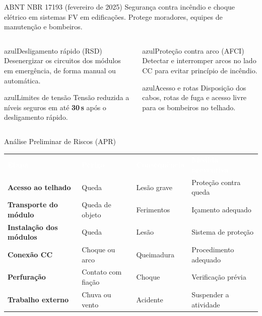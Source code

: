 \documentclass[aspectratio=169,10pt,xcolor=table]{beamer}
\newcommand{\cabecalho}{\rowcolor{azul}}
\newcommand{\tcab}[1]{\textcolor{white}{\bfseries #1}}
\begin{document}
\begin{frame}{ABNT NBR 17193 (fevereiro de 2025)}
  Segurança contra \alert{incêndio e choque elétrico} em sistemas FV em edificações.
  Protege moradores, equipes de manutenção e bombeiros.
  \vspace{0.5em}
  \begin{columns}[T]
    \begin{column}{0.48\textwidth}
      \begin{card}[equal height group=n1]{azul}{\faPowerOff\enspace Desligamento rápido (RSD)}
        Desenergizar os circuitos dos módulos em emergência, de forma manual ou automática.
      \end{card}
      \begin{card}[equal height group=n2]{azul}{\faTachometer*\enspace Limites de tensão}
        Tensão reduzida a níveis seguros em até \textbf{30\,s} após o desligamento rápido.
      \end{card}
    \end{column}
    \begin{column}{0.48\textwidth}
      \begin{card}[equal height group=n1]{azul}{\faFireExtinguisher\enspace Proteção contra arco (AFCI)}
        Detectar e interromper arcos no lado CC para evitar princípio de incêndio.
      \end{card}
      \begin{card}[equal height group=n2]{azul}{\faRoute\enspace Acesso e rotas}
        Disposição dos cabos, rotas de fuga e acesso livre para os bombeiros no telhado.
      \end{card}
    \end{column}
  \end{columns}
\end{frame}

\begin{frame}{Análise Preliminar de Riscos (APR)}
  \begin{center}\small
  \renewcommand{\arraystretch}{1.55}
  \begin{tabular}{>{\bfseries}L{3.6cm} L{3cm} L{2.4cm} L{4cm}}
    \cabecalho \tcab{Etapa} & \tcab{Perigo} & \tcab{Consequência} & \tcab{Medida preventiva}\\
    Acesso ao telhado & Queda & Lesão grave & Proteção contra queda\\
    Transporte do módulo & Queda de objeto & Ferimentos & Içamento adequado\\
    Instalação dos módulos & Queda & Lesão & Sistema de proteção\\
    Conexão CC & Choque ou arco & Queimadura & Procedimento adequado\\
    Perfuração & Contato com fiação & Choque & Verificação prévia\\
    Trabalho externo & Chuva ou vento & Acidente & Suspender a atividade\\
  \end{tabular}
  \end{center}
\end{frame}
\end{document}
